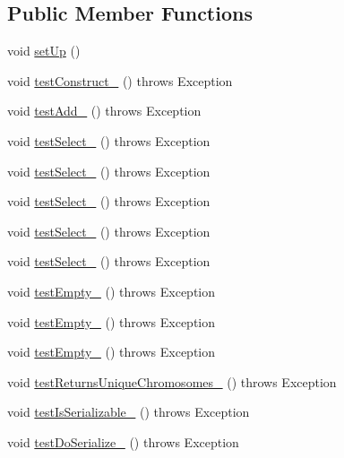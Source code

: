 \subsection*{Public Member Functions}
\begin{DoxyCompactItemize}
\item 
void \hyperlink{classorg_1_1jgap_1_1impl_1_1_weighted_roulette_selector_test_ad44cf462c4748f78956baa8ab710fa8f}{set\-Up} ()
\item 
void \hyperlink{classorg_1_1jgap_1_1impl_1_1_weighted_roulette_selector_test_af3f0f2bc67066f7f96fe19f007d4a0bc}{test\-Construct\-\_} ()  throws Exception
\item 
void \hyperlink{classorg_1_1jgap_1_1impl_1_1_weighted_roulette_selector_test_a999e3cadba9703051ffd5c109891d1fe}{test\-Add\-\_} ()  throws Exception 
\item 
void \hyperlink{classorg_1_1jgap_1_1impl_1_1_weighted_roulette_selector_test_ae6de7e7d291c29bf276fd9879fe2f3c4}{test\-Select\-\_} ()  throws Exception 
\item 
void \hyperlink{classorg_1_1jgap_1_1impl_1_1_weighted_roulette_selector_test_a9602e565a36da41077b40ce83763ac12}{test\-Select\-\_} ()  throws Exception 
\item 
void \hyperlink{classorg_1_1jgap_1_1impl_1_1_weighted_roulette_selector_test_a13904e811ddcef9461e6445518aac499}{test\-Select\-\_} ()  throws Exception 
\item 
void \hyperlink{classorg_1_1jgap_1_1impl_1_1_weighted_roulette_selector_test_a2c79461badb289ccda884a82f5fac43d}{test\-Select\-\_} ()  throws Exception 
\item 
void \hyperlink{classorg_1_1jgap_1_1impl_1_1_weighted_roulette_selector_test_a9be5f6b41c7bb1069cd7ea1be8702587}{test\-Select\-\_} ()  throws Exception 
\item 
void \hyperlink{classorg_1_1jgap_1_1impl_1_1_weighted_roulette_selector_test_ad62f32ed7b495f45ca22225c19a320f6}{test\-Empty\-\_} ()  throws Exception 
\item 
void \hyperlink{classorg_1_1jgap_1_1impl_1_1_weighted_roulette_selector_test_a0a4d4248b4d5341fb4437d797e83046b}{test\-Empty\-\_} ()  throws Exception 
\item 
void \hyperlink{classorg_1_1jgap_1_1impl_1_1_weighted_roulette_selector_test_af6c613340c922f80f7b31e0106fc2c23}{test\-Empty\-\_} ()  throws Exception 
\item 
void \hyperlink{classorg_1_1jgap_1_1impl_1_1_weighted_roulette_selector_test_a5c962c1e6c9db1fefb7ee9eff4c1804a}{test\-Returns\-Unique\-Chromosomes\-\_} ()  throws Exception 
\item 
void \hyperlink{classorg_1_1jgap_1_1impl_1_1_weighted_roulette_selector_test_a0b65cc46de20a3cf463329f3e4cd1fc9}{test\-Is\-Serializable\-\_} ()  throws Exception 
\item 
void \hyperlink{classorg_1_1jgap_1_1impl_1_1_weighted_roulette_selector_test_aafe88ab0510c8c1aafd47666aa786703}{test\-Do\-Serialize\-\_} ()  throws Exception 
\end{DoxyCompactItemize}
